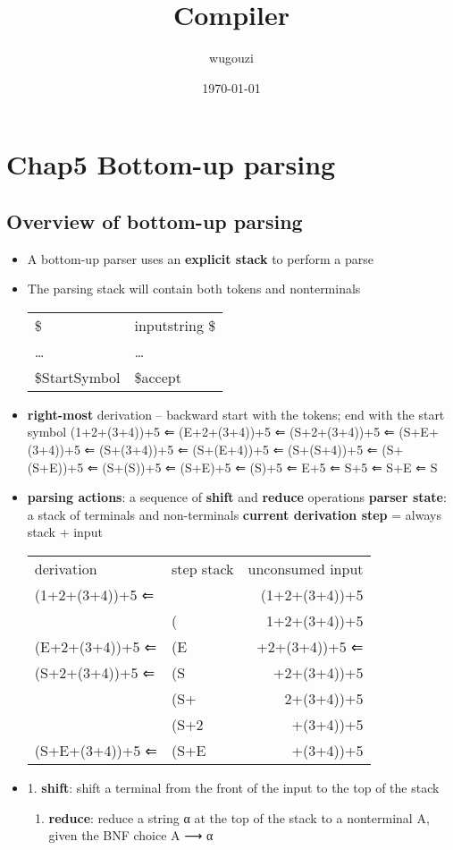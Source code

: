 \documentclass[11pt]{article}
\author{wugouzi}
\date{\today}
\title{Compiler}
\begin{document}
\maketitle
\tableofcontents

\section{Chap5 Bottom-up parsing}
\label{sec:org6337b5e}
\subsection{Overview of bottom-up parsing}
\label{sec:org72eeec2}
\begin{itemize}
\item A bottom-up parser uses an \textbf{explicit stack} to perform a parse
\item The parsing stack will contain both tokens and nonterminals
\begin{center}
\begin{tabular}{ll}
\$ & inputstring \$\\
\ldots{} & \ldots{}\\
\$StartSymbol & \$accept\\
\end{tabular}
\end{center}
\item \textbf{right-most} derivation -- backward
start with the tokens; end with the start symbol
(1+2+(3+4))+5 ⇐
(E+2+(3+4))+5 ⇐
(S+2+(3+4))+5 ⇐
(S+E+(3+4))+5 ⇐
(S+(3+4))+5 ⇐
(S+(E+4))+5 ⇐
(S+(S+4))+5 ⇐
(S+(S+E))+5 ⇐
(S+(S))+5 ⇐
(S+E)+5 ⇐
(S)+5 ⇐
E+5 ⇐
S+5 ⇐
S+E ⇐
S
\item \textbf{parsing actions}: a sequence of \textbf{shift} and \textbf{reduce} operations
\textbf{parser state}: a stack of terminals and non-terminals
\textbf{current derivation step} = always stack + input
\begin{center}
\begin{tabular}{llr}
derivation & step stack & unconsumed input\\
(1+2+(3+4))+5 ⇐ &  & (1+2+(3+4))+5\\
 & ( & 1+2+(3+4))+5\\
(E+2+(3+4))+5 ⇐ & (E & +2+(3+4))+5 ⇐\\
(S+2+(3+4))+5 ⇐ & (S & +2+(3+4))+5\\
 & (S+ & 2+(3+4))+5\\
 & (S+2 & +(3+4))+5\\
(S+E+(3+4))+5 ⇐ & (S+E & +(3+4))+5\\
\end{tabular}
\end{center}
\item 1. \textbf{shift}: shift a terminal from the front of the input to the top of the
stack 
\begin{enumerate}
\item \textbf{reduce}: reduce a string α at the top of the stack to a nonterminal A,
given the BNF choice A ⟶ α
\end{enumerate}


\end{itemize}
\end{document}
